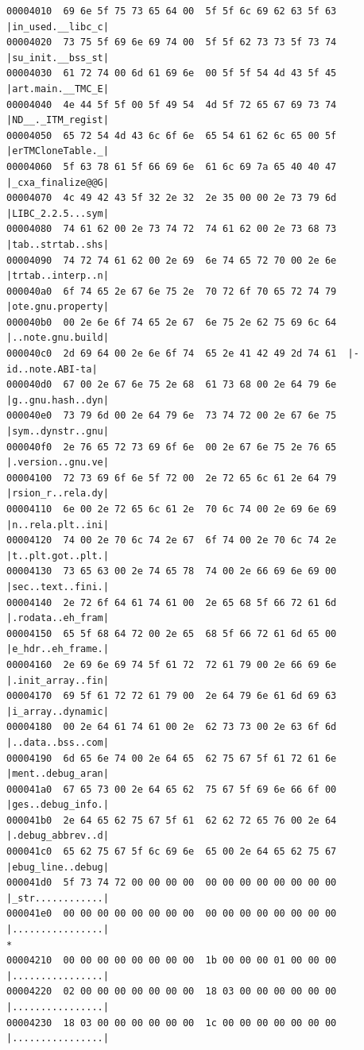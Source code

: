 \documentclass[]{project_plan}
\begin{document}
\begin{lstlisting}[basicstyle=\tiny]
00004010  69 6e 5f 75 73 65 64 00  5f 5f 6c 69 62 63 5f 63  |in_used.__libc_c|
00004020  73 75 5f 69 6e 69 74 00  5f 5f 62 73 73 5f 73 74  |su_init.__bss_st|
00004030  61 72 74 00 6d 61 69 6e  00 5f 5f 54 4d 43 5f 45  |art.main.__TMC_E|
00004040  4e 44 5f 5f 00 5f 49 54  4d 5f 72 65 67 69 73 74  |ND__._ITM_regist|
00004050  65 72 54 4d 43 6c 6f 6e  65 54 61 62 6c 65 00 5f  |erTMCloneTable._|
00004060  5f 63 78 61 5f 66 69 6e  61 6c 69 7a 65 40 40 47  |_cxa_finalize@@G|
00004070  4c 49 42 43 5f 32 2e 32  2e 35 00 00 2e 73 79 6d  |LIBC_2.2.5...sym|
00004080  74 61 62 00 2e 73 74 72  74 61 62 00 2e 73 68 73  |tab..strtab..shs|
00004090  74 72 74 61 62 00 2e 69  6e 74 65 72 70 00 2e 6e  |trtab..interp..n|
000040a0  6f 74 65 2e 67 6e 75 2e  70 72 6f 70 65 72 74 79  |ote.gnu.property|
000040b0  00 2e 6e 6f 74 65 2e 67  6e 75 2e 62 75 69 6c 64  |..note.gnu.build|
000040c0  2d 69 64 00 2e 6e 6f 74  65 2e 41 42 49 2d 74 61  |-id..note.ABI-ta|
000040d0  67 00 2e 67 6e 75 2e 68  61 73 68 00 2e 64 79 6e  |g..gnu.hash..dyn|
000040e0  73 79 6d 00 2e 64 79 6e  73 74 72 00 2e 67 6e 75  |sym..dynstr..gnu|
000040f0  2e 76 65 72 73 69 6f 6e  00 2e 67 6e 75 2e 76 65  |.version..gnu.ve|
00004100  72 73 69 6f 6e 5f 72 00  2e 72 65 6c 61 2e 64 79  |rsion_r..rela.dy|
00004110  6e 00 2e 72 65 6c 61 2e  70 6c 74 00 2e 69 6e 69  |n..rela.plt..ini|
00004120  74 00 2e 70 6c 74 2e 67  6f 74 00 2e 70 6c 74 2e  |t..plt.got..plt.|
00004130  73 65 63 00 2e 74 65 78  74 00 2e 66 69 6e 69 00  |sec..text..fini.|
00004140  2e 72 6f 64 61 74 61 00  2e 65 68 5f 66 72 61 6d  |.rodata..eh_fram|
00004150  65 5f 68 64 72 00 2e 65  68 5f 66 72 61 6d 65 00  |e_hdr..eh_frame.|
00004160  2e 69 6e 69 74 5f 61 72  72 61 79 00 2e 66 69 6e  |.init_array..fin|
00004170  69 5f 61 72 72 61 79 00  2e 64 79 6e 61 6d 69 63  |i_array..dynamic|
00004180  00 2e 64 61 74 61 00 2e  62 73 73 00 2e 63 6f 6d  |..data..bss..com|
00004190  6d 65 6e 74 00 2e 64 65  62 75 67 5f 61 72 61 6e  |ment..debug_aran|
000041a0  67 65 73 00 2e 64 65 62  75 67 5f 69 6e 66 6f 00  |ges..debug_info.|
000041b0  2e 64 65 62 75 67 5f 61  62 62 72 65 76 00 2e 64  |.debug_abbrev..d|
000041c0  65 62 75 67 5f 6c 69 6e  65 00 2e 64 65 62 75 67  |ebug_line..debug|
000041d0  5f 73 74 72 00 00 00 00  00 00 00 00 00 00 00 00  |_str............|
000041e0  00 00 00 00 00 00 00 00  00 00 00 00 00 00 00 00  |................|
*
00004210  00 00 00 00 00 00 00 00  1b 00 00 00 01 00 00 00  |................|
00004220  02 00 00 00 00 00 00 00  18 03 00 00 00 00 00 00  |................|
00004230  18 03 00 00 00 00 00 00  1c 00 00 00 00 00 00 00  |................|

\end{lstlisting}
\end{document}
